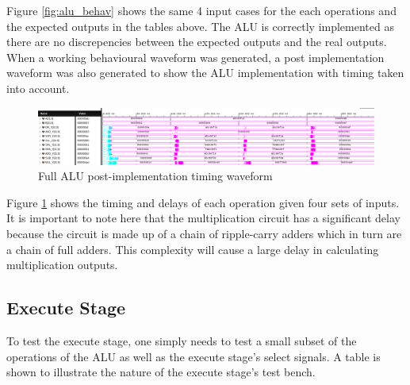 \documentclass[CMPE]{../KGCOEReport}
\begin{document}
    \pagebreak
    
    Figure \ref{fig:alu_behav} shows the same 4 input cases for the each operations
    and the expected outputs in the tables above. The ALU is correctly implemented as there
    are no discrepencies between the expected outputs and the real outputs.
    When a working behavioural waveform was generated, a post implementation waveform was
    also generated to show the ALU implementation with timing taken into account.
    
    \begin{figure}[h!]
        \centering
        \includegraphics[width=\textwidth]{img/alu_full_impl}
        \caption{Full ALU post-implementation timing waveform}
        \label{fig:alu_impl}
    \end{figure}
    
    Figure \ref{fig:alu_impl} shows the timing and delays of each operation given four
    sets of inputs. It is important to note here that the multiplication circuit has a
    significant delay because the circuit is made up of a chain of ripple-carry adders
    which in turn are a chain of full adders. This complexity will cause a large delay
    in calculating multiplication outputs.

    \subsection*{Execute Stage}

	To test the execute stage, one simply needs to test a small
	subset of the operations of the ALU as well as the execute stage's
	select signals.
	A table is shown to illustrate the nature of the execute stage's 
	test bench.
	
\end{document}
